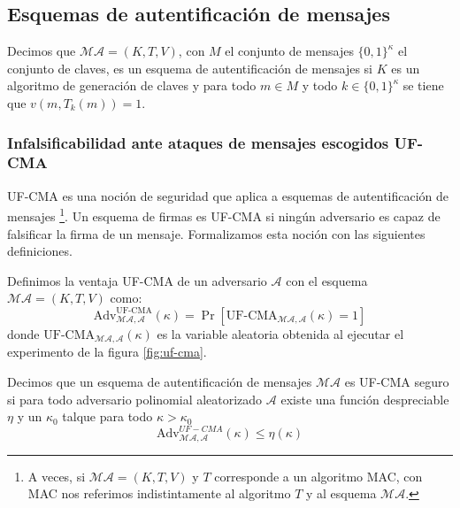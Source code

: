 \subsection{Esquemas de autentificación de mensajes}
\label{sect:uf-cma}
Decimos que $\mathcal{MA}=(K,T,V)$, con $M$ el conjunto de mensajes $\{0,1\}^\kappa$ el conjunto de claves,
es un esquema de autentificación de
mensajes si $K$ es un algoritmo de generación de claves y para todo $m \in M$ y todo
$k \in \{0,1\}^\kappa$ se tiene que $v(m, T_k(m)) = 1$.

\subsubsection{Infalsificabilidad ante ataques de mensajes escogidos UF-CMA}
UF-CMA es una noción de seguridad que aplica a esquemas de autentificación de mensajes
\footnote{A veces, si $\mathcal{MA} = (K, T, V)$ y $T$ corresponde a un algoritmo MAC,
con MAC nos referimos indistintamente al algoritmo $T$ y al esquema $\mathcal{MA}$.}.
Un esquema de firmas
es UF-CMA si ningún adversario es capaz de falsificar la firma de un mensaje. Formalizamos esta noción
con las siguientes definiciones.

\begin{definicion}
Definimos la ventaja \textrm{UF-CMA} de un adversario $\mathcal{A}$ con el esquema $\mathcal{MA} = (K, T, V)$
como:
$$\mathrm{Adv}^\text{UF-CMA}_{\mathcal{MA},\mathcal{A}}(\kappa) =
\Pr[\text{UF-CMA}_{\mathcal{MA},\mathcal{A}}(\kappa) = 1]$$
donde $\text{UF-CMA}_{\mathcal{MA},\mathcal{A}}(\kappa)$ es la variable aleatoria obtenida al
ejecutar el experimento de la figura \ref{fig:uf-cma}.
\end{definicion}

\begin{definicion}
Decimos que un esquema de autentificación de mensajes $\mathcal{MA}$ es UF-CMA seguro si para todo
adversario polinomial aleatorizado $\mathcal{A}$ existe una función despreciable $\eta$ y un $\kappa_0$
talque para todo $\kappa > \kappa_0$
$$\mathrm{Adv}^{UF-CMA}_{\mathcal{MA}, \mathcal{A}}(\kappa) \leq \eta(\kappa)$$
\end{definicion}

